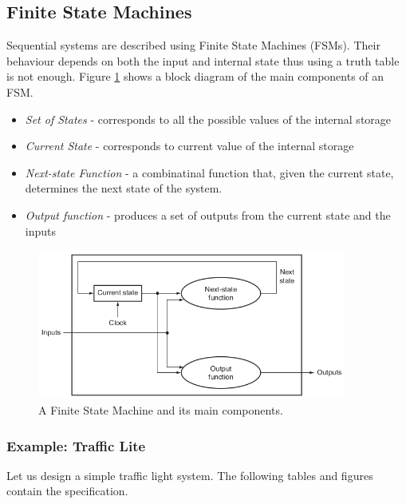 \documentclass[a4paper, 11pt,oneside]{article}
\begin{document}
\subsection{Finite State Machines}
Sequential systems are described using Finite State Machines (FSMs). Their 
behaviour depends on both the input and internal state thus using a truth table
is not enough. Figure \ref{fig:fsm0} shows a block diagram of the main 
components of an FSM. 

\begin{itemize}
\item \textit{Set of States} - corresponds to all the possible values of the 
internal storage
\item \textit{Current State} - corresponds to current value of the 
internal storage
\item \textit{Next-state Function} - a combinatinal function that, given the 
current 
state, determines the next state of the system.
\item \textit{Output function} - produces a set of outputs from the current 
state and 
the inputs  
\end{itemize}

\begin{figure}[H]
	\begin{center}
	\includegraphics[width=4in]{fsm0.png}
	\caption{A Finite State Machine and its main components.}
	\label{fig:fsm0} 
	\end{center}
\end{figure}

\subsubsection{Example: Traffic Lite}
Let us design a simple traffic light system. The following tables and figures 
contain the specification. 
\end{document}
